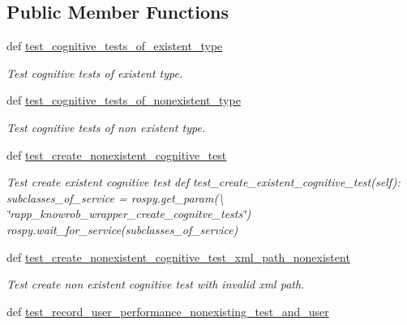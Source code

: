 \subsection*{Public Member Functions}
\begin{DoxyCompactItemize}
\item 
def \hyperlink{classcognitive__exercise__system__knowrob__services__functional__tests_1_1OntologyFunc_a55d3ca0e805f218c0334a17e6a5ad73f}{test\-\_\-cognitive\-\_\-tests\-\_\-of\-\_\-existent\-\_\-type}
\begin{DoxyCompactList}\small\item\em Test cognitive tests of existent type. \end{DoxyCompactList}\item 
def \hyperlink{classcognitive__exercise__system__knowrob__services__functional__tests_1_1OntologyFunc_a651c94c6b07b35dd8b9b3a66045ac502}{test\-\_\-cognitive\-\_\-tests\-\_\-of\-\_\-nonexistent\-\_\-type}
\begin{DoxyCompactList}\small\item\em Test cognitive tests of non existent type. \end{DoxyCompactList}\item 
def \hyperlink{classcognitive__exercise__system__knowrob__services__functional__tests_1_1OntologyFunc_af4ed2d90b352171d1cd40a6bc09f951d}{test\-\_\-create\-\_\-nonexistent\-\_\-cognitive\-\_\-test}
\begin{DoxyCompactList}\small\item\em Test create existent cognitive test def test\-\_\-create\-\_\-existent\-\_\-cognitive\-\_\-test(self)\-: subclasses\-\_\-of\-\_\-service = rospy.\-get\-\_\-param(\textbackslash{} \char`\"{}rapp\-\_\-knowrob\-\_\-wrapper\-\_\-create\-\_\-cognitve\-\_\-tests\char`\"{}) rospy.\-wait\-\_\-for\-\_\-service(subclasses\-\_\-of\-\_\-service) \end{DoxyCompactList}\item 
def \hyperlink{classcognitive__exercise__system__knowrob__services__functional__tests_1_1OntologyFunc_a60ac919b56f4153fb3c7e5f7149eedb3}{test\-\_\-create\-\_\-nonexistent\-\_\-cognitive\-\_\-test\-\_\-xml\-\_\-path\-\_\-nonexistent}
\begin{DoxyCompactList}\small\item\em Test create non existent cognitive test with invalid xml path. \end{DoxyCompactList}\item 
def \hyperlink{classcognitive__exercise__system__knowrob__services__functional__tests_1_1OntologyFunc_ab2bcb296c17b73a1baa76c55ffdade52}{test\-\_\-record\-\_\-user\-\_\-performance\-\_\-nonexisting\-\_\-test\-\_\-and\-\_\-user}

\end{DoxyCompactItemize}
